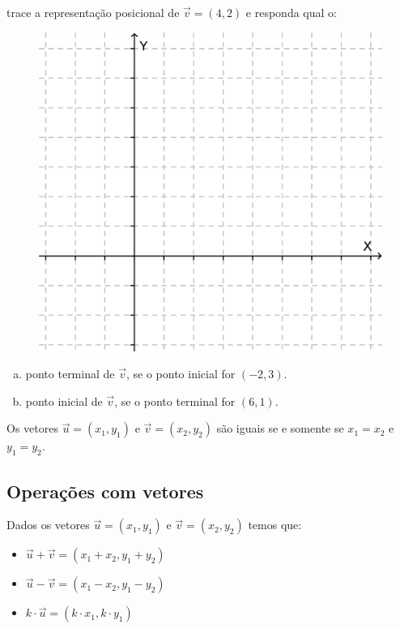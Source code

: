 \begin{exemplo} trace a representação posicional de $\vec{v}=(4, 2)$ e responda qual o:

\begin{figure}[H]
\includegraphics[scale=0.47]{analitica/imagens/malha.png}
\end{figure}

\begin{enumerate}[a)]
  \item ponto terminal de $\vec{v}$, se o ponto inicial for $(-2, 3)$.
  \item ponto inicial de $\vec{v}$, se o ponto terminal for $(6, 1)$.
\end{enumerate}
\end{exemplo}

\begin{df}
Os vetores $\vec{u}=(x_1, y_1)$ e $\vec{v}=(x_2, y_2)$ são iguais se e somente se $x_1=x_2$ e $y_1=y_2$.
\end{df}

\subsection{Operações com vetores}

Dados os vetores $\vec{u}=(x_1, y_1)$ e $\vec{v}=(x_2, y_2)$ temos que:

\begin{itemize}
\item $\vec{u}+\vec{v}=(x_1+x_2, y_1+y_2)$
\item $\vec{u}-\vec{v}=(x_1-x_2, y_1-y_2)$
\item $k\cdot \vec{u}=(k\cdot x_1, k\cdot y_1)$
\end{itemize}

